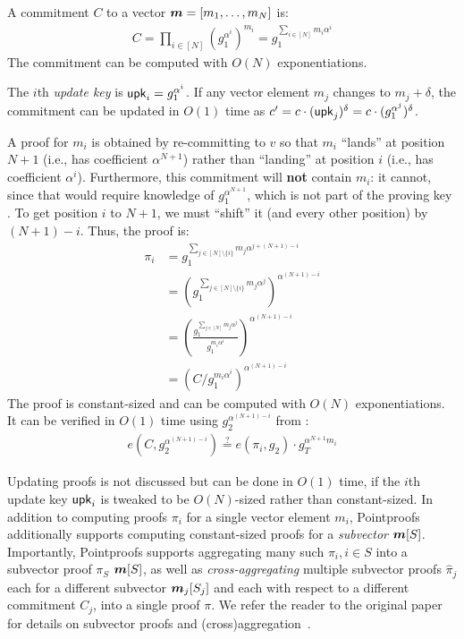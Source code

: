 A commitment $C$ to a vector $\bm{m}=[m_1,\dots,m_N]$ is:
\begin{align}
    C = \prod_{i\in[N]} \left(g_1^{\alpha^i}\right)^{m_i}
      = g_1^{\sum_{i\in [N]} m_i\alpha^i}
\end{align}
The commitment can be computed with $O(N)$ exponentiations.

The $i$th \textit{update key} is $\mathsf{upk}_i=g_1^{\alpha^i}$.
If any vector element $m_j$ changes to $m_j + \delta$, the commitment can be updated in $O(1)$ time as $c' = c \cdot (\mathsf{upk}_j)^{\delta} = c\cdot (g_1^{\alpha^j})^{\delta}$.

A proof for $m_i$ is obtained by re-committing to $v$ so that $m_i$ ``lands'' at position $N+1$ (i.e., has coefficient $\alpha^{N+1}$) rather than ``landing'' at position $i$ (i.e., has coefficient $\alpha^i$).
Furthermore, this commitment will \textbf{not} contain $m_i$: it cannot, since that would require knowledge of $g_1^{\alpha^{N+1}}$, which is not part of the proving key \prk.
To get position $i$ to $N+1$, we must ``shift'' it (and every other position) by $(N + 1) - i$.
Thus, the proof is:
\begin{align}
    \label{eq:indiv-proof}
    \pi_i &= g_1^{\sum_{j\in[N]\setminus\{i\}} m_j \alpha^{j + (N+1) - i}}\\
    &= \left(g_1^{\sum_{j\in[N]\setminus\{i\}} m_j \alpha^{j}}\right)^{\alpha^{(N+1) - i}}\\
    &= \left(\frac{g_1^{\sum_{j\in[N]} m_j \alpha^{j}}}{g_1^{m_i \alpha^i}}\right)^{\alpha^{(N+1) - i}}\\
    &= (C / g_1^{m_i \alpha^i})^{\alpha^{(N+1) - i}}
\end{align}
The proof is constant-sized and can be computed with $O(N)$ exponentiations.
It can be verified in $O(1)$ time using $g_2^{\alpha^{(N+1) - i}}$ from \vrk:
\begin{align}
    e(C, g_2^{\alpha^{(N+1)-i}}) \stackrel{?}{=} e(\pi_i, g_2) \cdot g_T^{\alpha^{N+1} m_i}
\end{align}

Updating proofs is not discussed but can be done in $O(1)$ time, if the $i$th update key $\mathsf{upk}_i$ is tweaked to be $O(N)$-sized rather than constant-sized.
In addition to computing proofs $\pi_i$ for a single vector element $m_i$, Pointproofs additionally supports computing constant-sized proofs for a \textit{subvector} $\bm{m}[S]$.
Importantly, Pointproofs supports aggregating many such $\pi_i, i\in S$ into a subvector proof $\pi_S$ $\bm{m}[S]$, as well as \textit{cross-aggregating} multiple subvector proofs $\hat{\pi}_j$ each for a different subvector $\bm{m}_j[S_j]$ and each with respect to a different commitment $C_j$, into a single proof $\pi$.
We refer the reader to the original paper for details on subvector proofs and (cross)aggregation~\cite{GRWZ20}.

